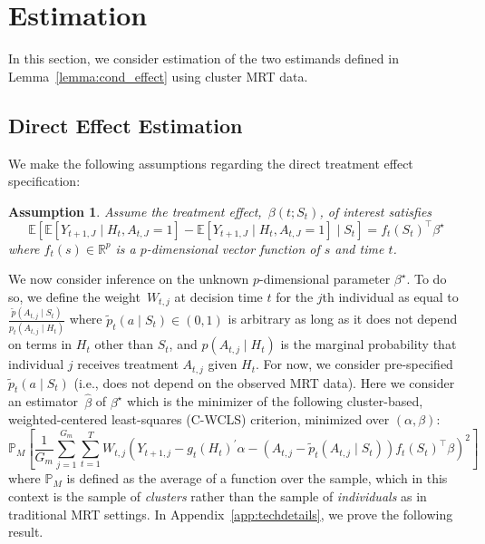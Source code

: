 \documentclass[12pt]{article}
\def\E{\mathbb{E}}
\newtheorem{assumption}[thm]{Assumption}
\begin{document}
\section{Estimation}
\label{section:estimation}

In this section, we consider estimation of the two estimands defined in Lemma~\ref{lemma:cond_effect} using cluster MRT data.

\subsection{Direct Effect Estimation}
We make the following assumptions regarding the direct treatment effect specification:

\begin{assumption} \normalfont
\label{ass:directeffect}
Assume the treatment effect,~$\beta(t;S_t)$, of interest satisfies
$$
\E \left[ \E \left[ Y_{t+1, J} \mid H_t, A_{t,J} = 1 \right] - \E \left[ Y_{t+1, J} \mid H_t, A_{t,J} = 1 \right] \mid S_t \right] = f_t (S_t)^\top \beta^\star
$$
where $f_t (s) \in \mathbb{R}^p$ is a $p$-dimensional vector function of $s$ and time $t$.
\end{assumption}

We now consider inference on the unknown $p$-dimensional parameter $\beta^\star$. To do so, we define the weight~$W_{t,j}$ at decision time $t$ for the $j$th individual as equal to $\frac{\tilde p (A_{t,j} \mid S_t)}{p_t (A_{t,j} \mid H_t)}$ where $\tilde p_t (a \mid S_t)\in (0,1)$ is arbitrary as long as it does not depend on terms in $H_t$ other than $S_t$, and $p(A_{t,j} \mid H_t)$ is the marginal probability that individual $j$ receives treatment $A_{t,j}$ given $H_t$.  For now, we consider pre-specified $\tilde p_t (a \mid S_t)$  (i.e., does not depend on the observed MRT data). Here we consider an estimator~$\hat \beta$ of $\beta^\star$ which is the minimizer of the following cluster-based,  weighted-centered least-squares (C-WCLS) criterion, minimized over $(\alpha, \beta)$:
\begin{equation}
\label{eq:directwcls}
\mathbb{P}_M \left[ \frac{1}{G_m} \sum_{j=1}^{G_m} \sum_{t=1}^T W_{t,j} \left(Y_{t+1,j} - g_t (H_t)^\prime \alpha - (A_{t,j} - \tilde p_t (A_{t,j} \mid S_t)) f_t(S_t)^\top \beta \right)^2 \right]
\end{equation}
where $\mathbb{P}_M$ is defined as the average of a function over the sample, which in this context is the sample of \emph{clusters} rather than the sample of \emph{individuals} as in traditional MRT settings. In Appendix~\ref{app:techdetails}, we prove the following result.
\end{document}
